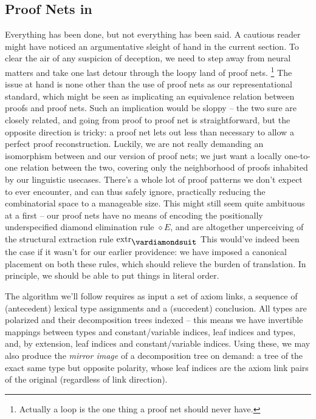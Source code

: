 \subsection{Proof Nets in \NLPplus}
Everything has been done, but not everything has been said.
A cautious reader might have noticed an argumentative sleight of hand in the current section.
To clear the air of any suspicion of deception, we need to step away from neural matters and take one last detour through the loopy land of proof nets.%
	\footnote{Actually a loop is the one thing a proof net should never have.}
The issue at hand is none other than the use of proof nets as our representational standard, which might be seen as implicating an equivalence relation between proofs and proof nets.
Such an implication would be sloppy -- the two sure are closely related, and going from proof to proof net is straightforward, but the opposite direction is tricky: a proof net lets out less than necessary to allow a perfect proof reconstruction.
Luckily, we are not really demanding an isomorphism between \NLPplus{} and our version of proof nets; we just want a locally one-to-one relation between the two, covering only the neighborhood of proofs inhabited by our linguistic usecases.
There's a whole lot of proof patterns we don't expect to ever encounter, and can thus safely ignore, practically reducing the combinatorial space to a manageable size.
This might still seem quite ambituous at a first -- our proof nets have no means of encoding the positionally underspecified diamond elimination rule $\diamond E$, and are altogether unperceiving of the structural extraction rule $\Extraction$
This would've indeed been the case if it wasn't for our earlier providence: we have imposed a canonical placement on both these rules, which should relieve the burden of translation.
In principle, we should be able to put things in literal order.

The algorithm we'll follow requires as input a set of axiom links, a sequence of (antecedent) lexical type assignments and a (succedent) conclusion.
All types are polarized and their decomposition trees indexed -- this means we have invertible mappings between types and constant/variable indices, leaf indices and types, and, by extension, leaf indices and constant/variable indices.
Using these, we may also produce the \textit{mirror image} of a decomposition tree on demand: a tree of the exact same type but opposite polarity, whose leaf indices are the axiom link pairs of the original (regardless of link direction).

